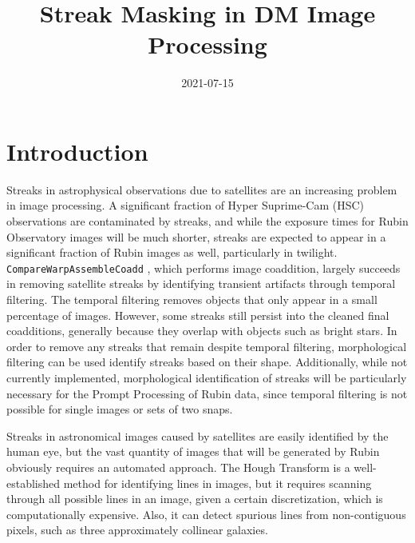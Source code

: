 \documentclass[DM,authoryear,toc]{lsstdoc}
\title{Streak Masking in DM Image Processing}
\date{2021-07-15}
\begin{document}
\maketitle

\section{Introduction}
Streaks in astrophysical observations due to satellites are an increasing problem in image processing. A significant fraction of Hyper Suprime-Cam (HSC) observations are contaminated by streaks, and while the exposure times for Rubin Observatory images will be much shorter, streaks are expected to appear in a significant fraction of Rubin images as well, particularly in twilight. \texttt{CompareWarpAssembleCoadd} , which performs image coaddition, largely succeeds in removing satellite streaks by identifying transient artifacts through temporal filtering. The temporal filtering removes objects that only appear in a small percentage of images. However, some streaks still persist into the cleaned final coadditions, generally because they overlap with objects such as bright stars. In order to remove any streaks that remain despite temporal filtering, morphological filtering can be used identify streaks based on their shape. Additionally, while not currently implemented, morphological identification of streaks will be particularly necessary for the Prompt Processing of Rubin data, since temporal filtering is not possible for single images or sets of two snaps.

Streaks in astronomical images caused by satellites are easily identified by the human eye, but the vast quantity of images that will be generated by Rubin obviously requires an automated approach. The Hough Transform \citep{Hough:1962,Douda:1972} is a well-established method for identifying lines in images, but it requires scanning through all possible lines in an image, given a certain discretization, which is computationally expensive. Also, it can detect spurious lines from non-contiguous pixels, such as three approximately collinear galaxies.
\end{document}
